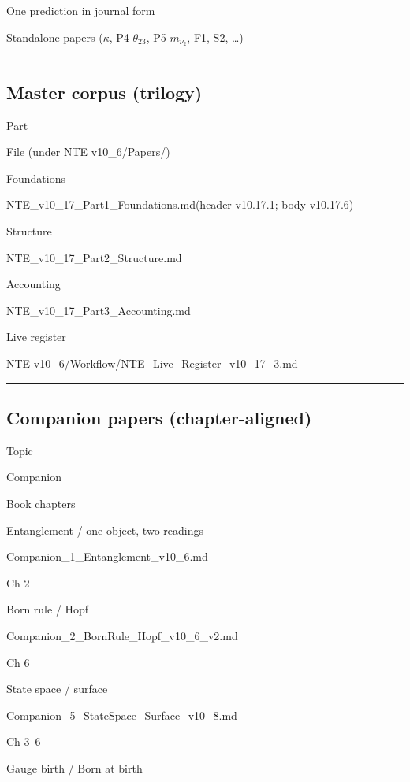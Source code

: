 \documentclass[
  11pt,
]{article}
\begin{document}
One prediction in journal form

Standalone papers (\(\kappa\), P4 \(\theta_{23}\), P5 \(m_{\nu_2}\), F1,
S2, \ldots)

\begin{center}\rule{0.5\linewidth}{0.5pt}\end{center}

\subsection{Master corpus (trilogy)}\label{master-corpus-trilogy}

Part

File (under NTE v10\_6/Papers/)

Foundations

NTE\_v10\_17\_Part1\_Foundations.md(header v10.17.1; body v10.17.6)

Structure

NTE\_v10\_17\_Part2\_Structure.md

Accounting

NTE\_v10\_17\_Part3\_Accounting.md

Live register

NTE v10\_6/Workflow/NTE\_Live\_Register\_v10\_17\_3.md

\begin{center}\rule{0.5\linewidth}{0.5pt}\end{center}

\subsection{Companion papers
(chapter-aligned)}\label{companion-papers-chapter-aligned}

Topic

Companion

Book chapters

Entanglement / one object, two readings

Companion\_1\_Entanglement\_v10\_6.md

Ch 2

Born rule / Hopf

Companion\_2\_BornRule\_Hopf\_v10\_6\_v2.md

Ch 6

State space / surface

Companion\_5\_StateSpace\_Surface\_v10\_8.md

Ch 3--6

Gauge birth / Born at birth
\end{document}
